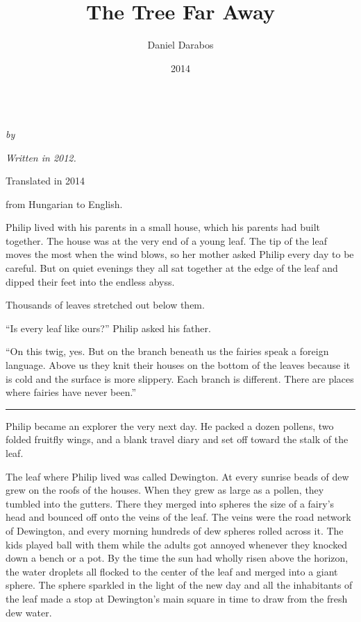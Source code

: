 \documentclass[10pt, draft]{memoir}
\author{Daniel Darabos}
\date{2014}
\title{The Tree Far Away}
\renewcommand{\pfbreakdisplay}{\bigskip \ding{166} \bigskip}
\newcommand{\secbreak}{\fancybreak{\pfbreakdisplay}}
\begin{document}
\begin{titlingpage}
  \centering
  \vspace*{0.2\textheight}
  {\Huge \thetitle}\\[\baselineskip]
  {\large\itshape by \theauthor}\\[\baselineskip]
  \vfill
  {\itshape Written in 2012. \par
  Translated in 2014 \par from Hungarian to English.}
  \vspace*{0.1\textheight}
\end{titlingpage}

\par

Philip lived with his parents in a small house, which his parents had built together. The house was at the very end of a young leaf. The tip of the leaf moves the most when the wind blows, so her mother asked Philip every day to be careful. But on quiet evenings they all sat together at the edge of the leaf and dipped their feet into the endless abyss.

Thousands of leaves stretched out below them.

``Is every leaf like ours?'' Philip asked his father.

``On this twig, yes. But on the branch beneath us the fairies speak a foreign language. Above us they knit their houses on the bottom of the leaves because it is cold and the surface is more slippery. Each branch is different. There are places where fairies have never been.”

\secbreak

Philip became an explorer the very next day. He packed a dozen pollens, two folded fruitfly wings, and a blank travel diary and set off toward the stalk of the leaf.

The leaf where Philip lived was called Dewington. At every sunrise beads of dew grew on the roofs of the houses. When they grew as large as a pollen, they tumbled into the gutters. There they merged into spheres the size of a fairy's head and bounced off onto the veins of the leaf. The veins were the road network of Dewington, and every morning hundreds of dew spheres rolled across it. The kids played ball with them while the adults got annoyed whenever they knocked down a bench or a pot. By the time the sun had wholly risen above the horizon, the water droplets all flocked to the center of the leaf and merged into a giant sphere. The sphere sparkled in the light of the new day and all the inhabitants of the leaf made a stop at Dewington's main square in time to draw from the fresh dew water.
\end{document}
